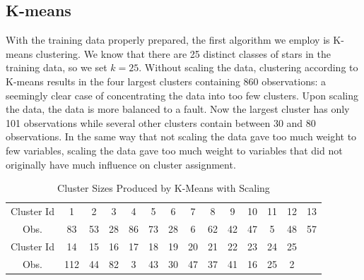 \documentclass[12pt]{article}
\begin{document}
\subsection{K-means}
With the training data properly prepared, the first algorithm we employ is K-means clustering.  We know that there are 25 distinct classes of stars in the training data, so we set $k=25$.  Without scaling the data, clustering according to K-means results in the four largest clusters containing 860 observations: a seemingly clear case of concentrating the data into too few clusters. Upon scaling the data, the data is more balanced to a fault.  Now the largest cluster has only 101 observations while several other clusters contain between 30 and 80 observations.  In the same way that not scaling the data gave too much weight to few variables, scaling the data gave too much weight to variables that did not originally have much influence on cluster assignment.

\begin{table}[h]
\center
\caption{Cluster Sizes Produced by K-Means with Scaling}
\begin{tabular}{c c c c c c c c c c c c c c}
\hline
Cluster Id & 1 & 2  & 3  & 4  & 5  & 6  & 7 & 8  & 9  & 10 & 11 & 12 & 13 \\
Obs. 	   &83 & 53 & 28 & 86 & 73 & 28 & 6 & 62 & 42 & 47 & 5  & 48 & 57 \\
\hline
Cluster Id & 14  & 15 & 16 & 17 & 18 & 19 & 20 & 21 & 22 & 23 & 24 & 25 &\\
Obs.       & 112 & 44 & 82 & 3  & 43 & 30 & 47 & 37 & 41 & 16 & 25 & 2 & \\
\hline
\end{tabular}
\end{table}


\end{document}

